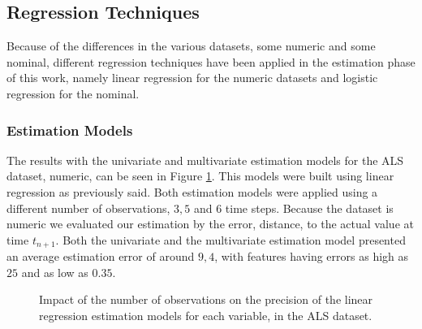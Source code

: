 \subsection{Regression Techniques}
\label{subsection:regression}

Because of the differences in the various datasets, some numeric and some nominal, different regression techniques have been applied
 in the estimation phase of this work, namely linear regression for the numeric datasets and logistic regression for the nominal.
  
\subsubsection{Estimation Models}
\label{subsubsection:estimation_regression}

The results with the univariate and multivariate estimation models for the ALS dataset, numeric, can be seen in 
Figure \ref{fig:estimationals}. This models were built using linear regression as previously said. Both estimation models were 
applied using a different number of observations, $3, 5$ and $6$ time steps.
 Because the dataset is numeric we evaluated our estimation by the error, distance, to the actual value at time $t_{n+1}$.
 Both the univariate and the multivariate estimation model presented an average estimation error of  around $9,4$, with
 features having errors as high as $25$ and as low as $0.35$.
  
\begin{figure}[h]
	\begin{subfigmatrix}{2}
  \end{subfigmatrix}
  \caption{Impact of the number of observations on the precision of the linear regression estimation models for each variable, in the ALS dataset.}
  \label{fig:estimationals}
\end{figure}

